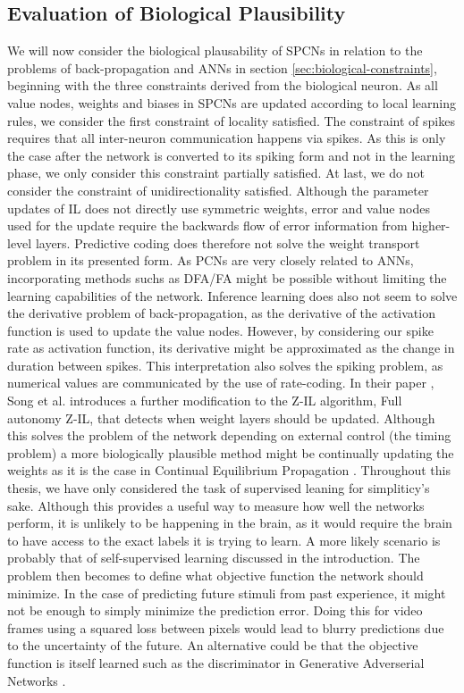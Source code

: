 \documentclass[a4paper,11pt]{article} %
\begin{document}
\subsection{Evaluation of Biological Plausibility}
We will now consider the biological plausability of SPCNs in relation to the problems of back-propagation and ANNs in section \ref{sec:biological-constraints}, beginning with the three constraints derived from the biological neuron. As all value nodes, weights and biases in SPCNs are updated according to local learning rules, we consider the first constraint of locality satisfied. The constraint of spikes requires that all inter-neuron communication happens via spikes. As this is only the case after the network is converted to its spiking form and not in the learning phase, we only consider this constraint partially satisfied. At last, we do not consider the constraint of unidirectionality satisfied. Although the parameter updates of IL does not directly use symmetric weights, error and value nodes used for the update require the backwards flow of error information from higher-level layers. Predictive coding does therefore not solve the weight transport problem in its presented form. As PCNs are very closely related to ANNs, incorporating methods suchs as DFA/FA might be possible without limiting the learning capabilities of the network. Inference learning does also not seem to solve the derivative problem of back-propagation, as the derivative of the activation function is used to update the value nodes. However, by considering our spike rate as activation function, its derivative might be approximated as the change in duration between spikes. This interpretation also solves the spiking problem, as numerical values are communicated by the use of rate-coding. In their paper \cite{PredictiveCodingNetworks}, Song et al. introduces a further modification to the Z-IL algorithm, Full autonomy Z-IL, that detects when weight layers should be updated. Although this solves the problem of the network depending on external control (the timing problem) a more biologically plausible method might be continually updating the weights as it is the case in Continual Equilibrium Propagation \cite{ContinualEqProp}.  Throughout this thesis, we have only considered the task of supervised leaning for simpliticy's sake. Although this provides a useful way to measure how well the networks perform, it is unlikely to be happening in the brain, as it would require the brain to have access to the exact labels it is trying to learn. A more likely scenario is probably that of self-supervised learning discussed in the introduction. The problem then becomes to define what objective function the network should minimize. In the case of predicting future stimuli from past experience, it might not be enough to simply minimize the prediction error. Doing this for video frames using a squared loss between pixels would lead to blurry predictions due to the uncertainty of the future. An alternative could be that the objective function is itself learned such as the discriminator in Generative Adverserial Networks \cite{goodfellow2014generative}. 
\end{document}
